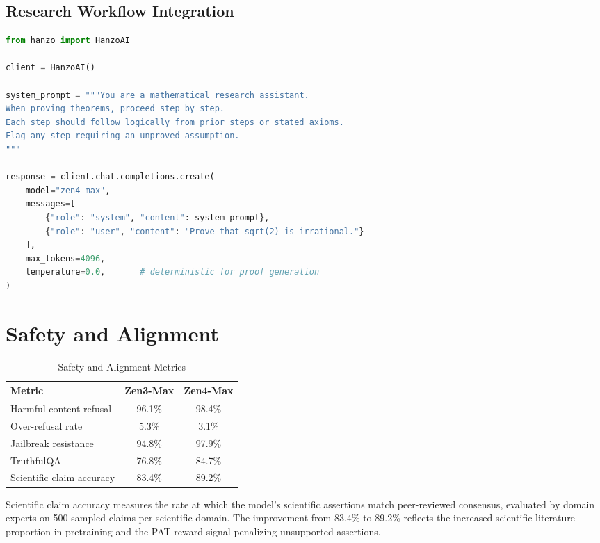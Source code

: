 \documentclass[11pt,a4paper]{article}
\begin{document}
\subsection{Research Workflow Integration}

\begin{lstlisting}[language=Python, caption=Zen4-Max for Mathematical Proof Assistance]
from hanzo import HanzoAI

client = HanzoAI()

system_prompt = """You are a mathematical research assistant.
When proving theorems, proceed step by step.
Each step should follow logically from prior steps or stated axioms.
Flag any step requiring an unproved assumption.
"""

response = client.chat.completions.create(
    model="zen4-max",
    messages=[
        {"role": "system", "content": system_prompt},
        {"role": "user", "content": "Prove that sqrt(2) is irrational."}
    ],
    max_tokens=4096,
    temperature=0.0,       # deterministic for proof generation
)
\end{lstlisting}

\section{Safety and Alignment}

\begin{table}[H]
\centering
\begin{tabular}{lcc}
\toprule
\textbf{Metric} & \textbf{Zen3-Max} & \textbf{Zen4-Max} \\
\midrule
Harmful content refusal       & 96.1\% & 98.4\% \\
Over-refusal rate             & 5.3\%  & 3.1\%  \\
Jailbreak resistance          & 94.8\% & 97.9\% \\
TruthfulQA                    & 76.8\% & 84.7\% \\
Scientific claim accuracy     & 83.4\% & 89.2\% \\
\bottomrule
\end{tabular}
\caption{Safety and Alignment Metrics}
\end{table}

Scientific claim accuracy measures the rate at which the model's scientific assertions
match peer-reviewed consensus, evaluated by domain experts on 500 sampled claims per
scientific domain. The improvement from 83.4\% to 89.2\% reflects the increased
scientific literature proportion in pretraining and the PAT reward signal penalizing
unsupported assertions.
\end{document}
